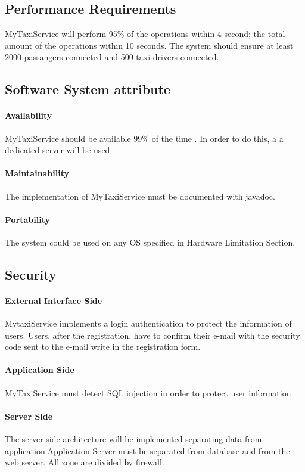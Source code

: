 \subsection{Performance Requirements}
MyTaxiService will perform 95\% of the operations within 4 second; the total amount of the operations within 10 seconds.
The system should ensure at least 2000 passangers connected and 500 taxi drivers connected. 

\subsection{Software System attribute}

\paragraph{Availability}
MyTaxiService should be available 99\% of the time . In order to do this, a a dedicated server will be used.

\paragraph{Maintainability}
The implementation of MyTaxiService must be documented with javadoc. 

\paragraph{Portability}
The system could be used on any OS specified in Hardware Limitation Section.

\subsection{Security}

\paragraph{External Interface Side}
MytaxiService implements a login authentication to protect the information of users. Users, after the registration, have to confirm their e-mail with the security code sent to the e-mail write in the registration form. 

\paragraph{Application Side}
MyTaxiService must detect SQL injection in order to protect user information. 

\paragraph{Server Side}
The server side architecture will be implemented separating
data from application.Application Server must be separated
from database and from the web server. All zone are divided by firewall. 
